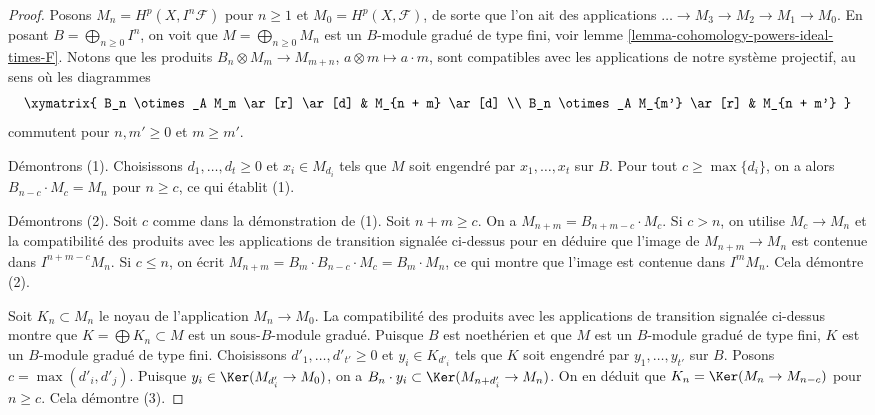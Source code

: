 \begin{proof}
Posons $M_n = H^p(X, I^n\mathcal{F})$ pour $n \geq 1$ et
$M_0 = H^p(X, \mathcal{F})$, de sorte que l'on ait des applications
$\ldots \to M_3 \to M_2 \to M_1 \to M_0$. En posant
$B = \bigoplus_{n \geq 0} I^n$, on voit que $M = \bigoplus_{n \geq 0} M_n$
est un $B$-module gradué de type fini,
voir lemme \ref{lemma-cohomology-powers-ideal-times-F}.
Notons que les produits
$B_n \otimes M_m \to M_{m + n}$, $a \otimes m \mapsto a \cdot m$,
sont compatibles avec les applications de notre système projectif, au sens
où les diagrammes
$$
\xymatrix{
B_n \otimes_A M_m \ar[r] \ar[d] & M_{n + m} \ar[d] \\
B_n \otimes_A M_{m'} \ar[r] & M_{n + m'}
}
$$
commutent pour $n, m' \geq 0$ et $m \geq m'$.

\medskip\noindent
Démontrons (1). Choisissons $d_1, \ldots, d_t \geq 0$ et $x_i \in M_{d_i}$
tels que $M$ soit engendré par $x_1, \ldots, x_t$ sur $B$.
Pour tout $c \geq \max\{d_i\}$, on a alors
$B_{n - c} \cdot M_c = M_n$ pour $n \geq c$, ce qui établit (1).

\medskip\noindent
Démontrons (2). Soit $c$ comme dans la démonstration de (1). Soit $n + m \geq c$.
On a $M_{n + m} = B_{n + m - c} \cdot M_c$.
Si $c > n$, on utilise $M_c \to M_n$ et la compatibilité des produits
avec les applications de transition signalée ci-dessus pour en déduire
que l'image de $M_{n + m} \to M_n$ est contenue dans $I^{n + m - c}M_n$.
Si $c \leq n$, on écrit $M_{n + m} = B_m \cdot B_{n - c} \cdot M_c =
B_m \cdot M_n$, ce qui montre que l'image est contenue dans $I^m M_n$.
Cela démontre (2).

\medskip\noindent
Soit $K_n \subset M_n$ le noyau de l'application $M_n \to M_0$. La
compatibilité des produits avec les applications de transition signalée ci-dessus
montre que $K = \bigoplus K_n \subset M$ est un sous-$B$-module gradué.
Puisque $B$ est noethérien et que $M$ est un $B$-module
gradué de type fini, $K$ est un $B$-module gradué de
type fini. Choisissons $d'_1, \ldots, d'_{t'} \geq 0$ et $y_i \in K_{d'_i}$
tels que $K$ soit engendré par $y_1, \ldots, y_{t'}$ sur $B$.
Posons $c = \max(d'_i, d'_j)$. Puisque $y_i \in \Ker(M_{d'_i} \to M_0)$,
on a $B_n \cdot y_i \subset \Ker(M_{n + d'_i} \to M_n)$.
On en déduit que $K_n = \Ker(M_n \to M_{n - c})$ pour $n \geq c$.
Cela démontre (3).


\end{proof}
